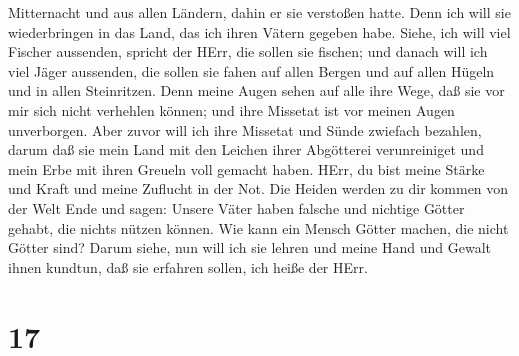 Mitternacht und aus allen Ländern, dahin er sie verstoßen hatte. Denn
ich will sie wiederbringen in das Land, das ich ihren Vätern gegeben
habe.  Siehe, ich will viel Fischer aussenden, spricht der
HErr, die sollen sie fischen; und danach will ich viel Jäger aussenden,
die sollen sie fahen auf allen Bergen und auf allen Hügeln und in allen
Steinritzen.  Denn meine Augen sehen auf alle ihre Wege,
daß sie vor mir sich nicht verhehlen können; und ihre Missetat ist vor
meinen Augen unverborgen.  Aber zuvor will ich ihre
Missetat und Sünde zwiefach bezahlen, darum daß sie mein Land mit den
Leichen ihrer Abgötterei verunreiniget und mein Erbe mit ihren Greueln
voll gemacht haben.  HErr, du bist meine Stärke und Kraft
und meine Zuflucht in der Not. Die Heiden werden zu dir kommen von der
Welt Ende und sagen: Unsere Väter haben falsche und nichtige Götter
gehabt, die nichts nützen können.  Wie kann ein Mensch
Götter machen, die nicht Götter sind?  Darum siehe, nun
will ich sie lehren und meine Hand und Gewalt ihnen kundtun, daß sie
erfahren sollen, ich heiße der HErr.

\hypertarget{section-16}{%
\section{17}\label{section-16}}

